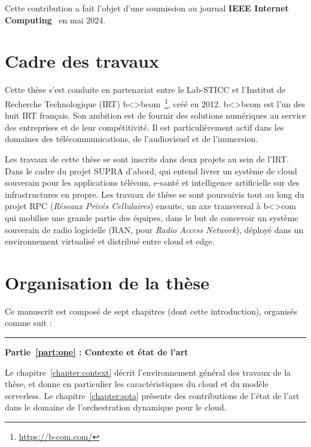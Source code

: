 Cette contribution a fait l'objet d'une soumission au journal \textbf{IEEE Internet Computing}~\cite{herosim} en mai 2024.

\section{Cadre des travaux}

Cette thèse s'est conduite en partenariat entre le Lab-STICC et l'Institut de Recherche Technologique (IRT) b{\textless\textgreater}bcom~\footnote{\href{https://b-com.com/}{https://b-com.com/}}, créé en 2012. b{\textless\textgreater}bcom est l'un des huit IRT français. Son ambition est de fournir des solutions numériques au service des entreprises et de leur compétitivité. Il est particulièrement actif dans les domaines des télécommunications, de l'audiovisuel et de l'immersion.

Les travaux de cette thèse se sont inscrits dans deux projets au sein de l'IRT. Dans le cadre du projet SUPRA d'abord, qui entend livrer un système de cloud souverain pour les applications télécom, e-santé et intelligence artificielle sur des infrastructures en propre. Les travaux de thèse se sont poursuivis tout au long du projet RPC (\textit{Réseaux Privés Cellulaires}) ensuite, un axe transversal à b{\textless\textgreater}com qui mobilise une grande partie des équipes, dans le but de concevoir un système souverain de radio logicielle (RAN, pour \textit{Radio Access Network}), déployé dans un environnement virtualisé et distribué entre cloud et edge.

\clearpage

\section{Organisation de la thèse}

Ce manuscrit est composé de sept chapitres (dont cette introduction), organisés comme suit :

\begin{center}
    \rule{4cm}{0.4pt}
\end{center}

\textbf{Partie~\ref{part:one} : Contexte et état de l'art}

Le chapitre~\ref{chapter:context} décrit l'environnement général des travaux de la thèse, et donne en particulier les caractéristiques du cloud et du modèle serverless. Le chapitre~\ref{chapter:sota} présente des contributions de l'état de l'art dans le domaine de l'orchestration dynamique pour le cloud.

